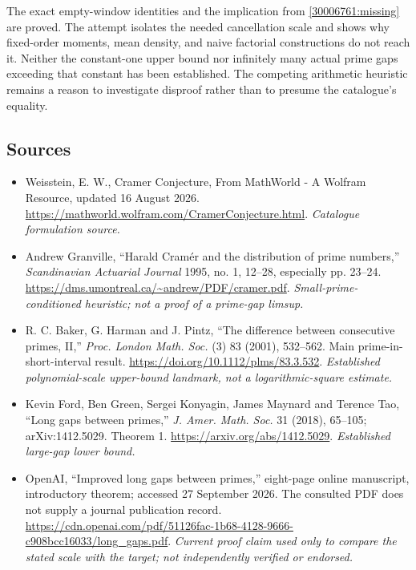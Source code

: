 \documentclass[11pt,a4paper]{article}
\numberwithin{equation}{section}
\begin{document}
The exact empty-window identities and the implication from
\eqref{30006761:missing} are proved. The attempt isolates the needed
cancellation scale and shows why fixed-order moments, mean density, and
naive factorial constructions do not reach it. Neither the constant-one
upper bound nor infinitely many actual prime gaps exceeding that constant
has been established. The competing arithmetic heuristic remains a reason
to investigate disproof rather than to presume the catalogue's equality.

\subsection{Sources}
\begin{itemize}\raggedright
\item[\textnormal{[S1]}]\hypertarget{source:30006761:1}{} Weisstein, E. W., Cramer Conjecture, From MathWorld - A Wolfram Resource, updated 16 August 2026.
\url{https://mathworld.wolfram.com/CramerConjecture.html}.
{\small\textit{Catalogue formulation source.}}
\item[\textnormal{[E1]}]\hypertarget{extra:30006761:1}{} Andrew Granville, ``Harald Cram\'er and the distribution of prime numbers,'' \emph{Scandinavian Actuarial Journal} 1995, no. 1, 12--28, especially pp. 23--24.
\url{https://dms.umontreal.ca/~andrew/PDF/cramer.pdf}.
{\small\textit{Small-prime-conditioned heuristic; not a proof of a prime-gap limsup.}}
\item[\textnormal{[E2]}]\hypertarget{extra:30006761:2}{} R. C. Baker, G. Harman and J. Pintz, ``The difference between consecutive primes, II,'' \emph{Proc. London Math. Soc.} (3) 83 (2001), 532--562. Main prime-in-short-interval result.
\url{https://doi.org/10.1112/plms/83.3.532}.
{\small\textit{Established polynomial-scale upper-bound landmark, not a logarithmic-square estimate.}}
\item[\textnormal{[E3]}]\hypertarget{extra:30006761:3}{} Kevin Ford, Ben Green, Sergei Konyagin, James Maynard and Terence Tao, ``Long gaps between primes,'' \emph{J. Amer. Math. Soc.} 31 (2018), 65--105; arXiv:1412.5029. Theorem 1.
\url{https://arxiv.org/abs/1412.5029}.
{\small\textit{Established large-gap lower bound.}}
\item[\textnormal{[E4]}]\hypertarget{extra:30006761:4}{} OpenAI, ``Improved long gaps between primes,'' eight-page online manuscript, introductory theorem; accessed 27 September 2026. The consulted PDF does not supply a journal publication record.
\url{https://cdn.openai.com/pdf/51126fac-1b68-4128-9666-c908bcc16033/long_gaps.pdf}.
{\small\textit{Current proof claim used only to compare the stated scale with the target; not independently verified or endorsed.}}
\end{itemize}
\end{document}
